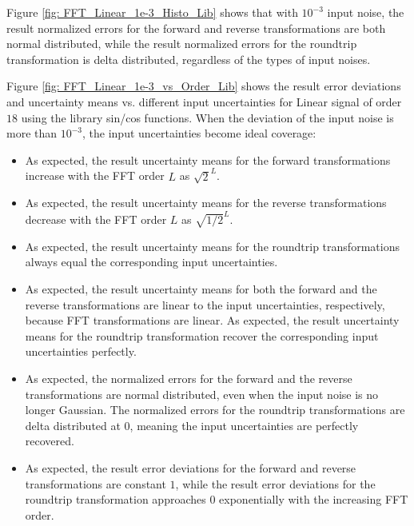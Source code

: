 \documentclass[twoside]{article}
\numberwithin{equation}{section}
\begin{document}
Figure \ref{fig: FFT_Linear_1e-3_Histo_Lib} shows that with $10^{-3}$ input noise, the result normalized errors for the forward and reverse transformations are both normal distributed, while the result normalized errors for the roundtrip transformation is delta distributed, regardless of the types of input noises.

Figure \ref{fig:  FFT_Linear_1e-3_vs_Order_Lib} shows the result error deviations and uncertainty means vs. different input uncertainties for Linear signal of order $18$ using the library sin/cos functions.  
When the deviation of the input noise is more than $10^{-3}$, the input uncertainties become ideal coverage:
\begin{itemize}
\item As expected, the result uncertainty means for the forward transformations increase with the FFT order $L$ as $\sqrt{2}^L$.

\item As expected, the result uncertainty means for the reverse transformations decrease with the FFT order $L$ as $\sqrt{1/2}^L$.

\item As expected, the result uncertainty means for the roundtrip transformations always equal the corresponding input uncertainties.

\item As expected, the result uncertainty means for both the forward and the reverse transformations are linear to the input uncertainties, respectively, because FFT transformations are linear.
As expected, the result uncertainty means for the roundtrip transformation recover the corresponding input uncertainties perfectly.

\item As expected, the normalized errors for the forward and the reverse transformations are normal distributed, even when the input noise is no longer Gaussian.
The normalized errors for the roundtrip transformations are delta distributed at $0$, meaning the input uncertainties are perfectly recovered.

\item As expected, the result error deviations for the forward and reverse transformations are constant $1$, while the result error deviations for the roundtrip transformation approaches $0$ exponentially with the increasing FFT order.

\end{itemize}
\end{document}
